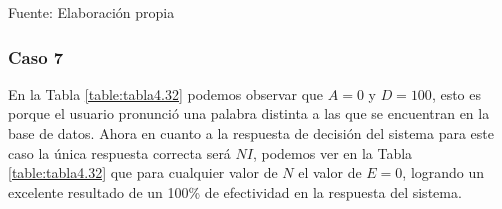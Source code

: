 \begin{center}
\begin{table}[H]
\centering
\caption{\small{Resultados para el caso 6 con U1 estático.}}
\label{table:tabla4.31}
\vskip 0.2cm
\begin{center}
\vskip 0.2cm
{\small{Fuente: Elaboración propia}}
\end{center}
\end{table}
\end{center}

\subsubsection{Caso 7}
En la Tabla \ref{table:tabla4.32} podemos observar que $A = 0$ y $D = 100$, esto es porque el usuario pronunció una palabra distinta a las que se encuentran en la base de datos.
\vskip 0.5cm
Ahora en cuanto a la respuesta de decisión del sistema para este caso la única respuesta correcta será $NI$, podemos ver en la Tabla \ref{table:tabla4.32} que para cualquier valor de $N$ el valor de $E = 0$, logrando un excelente resultado de un 100\% de efectividad en la respuesta del sistema.

